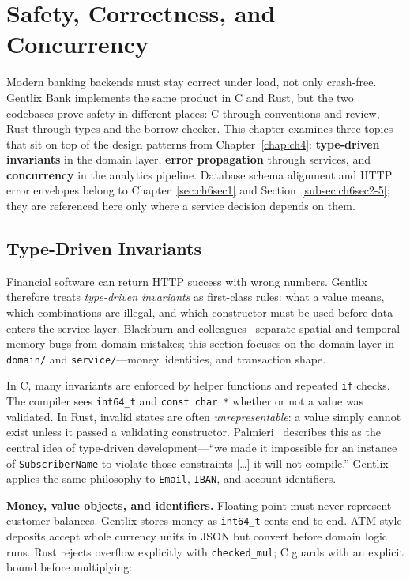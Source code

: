 \chapter{Safety, Correctness, and Concurrency}
\label{chap:ch5}

\par Modern banking backends must stay correct under load, not only crash-free. Gentlix Bank
implements the same product in C and Rust, but the two codebases prove safety in different
places: C through conventions and review, Rust through types and the borrow checker.
This chapter examines three topics that sit on top of the design patterns from
Chapter~\ref{chap:ch4}: \textbf{type-driven invariants} in the domain layer,
\textbf{error propagation} through services, and \textbf{concurrency} in the analytics
pipeline. Database schema alignment and HTTP error envelopes belong to
Chapter~\ref{sec:ch6sec1} and Section~\ref{subsec:ch6sec2-5}; they are referenced here
only where a service decision depends on them.

\section{Type-Driven Invariants}
\label{sec:ch5sec1}

Financial software can return HTTP success with wrong numbers. Gentlix therefore treats
\emph{type-driven invariants} as first-class rules: what a value means, which combinations
are illegal, and which constructor must be used before data enters the service layer.
Blackburn and colleagues~\cite{Blackburn2025} separate spatial and temporal memory bugs
from domain mistakes; this section focuses on the domain layer in \texttt{domain/} and
\texttt{service/}---money, identities, and transaction shape.

In C, many invariants are enforced by helper functions and repeated \texttt{if} checks.
The compiler sees \texttt{int64\_t} and \texttt{const char *} whether or not a value was
validated. In Rust, invalid states are often \emph{unrepresentable}: a value simply
cannot exist unless it passed a validating constructor. Palmieri~\cite{Palmieri2022}
describes this as the central idea of type-driven development---``we made it impossible
for an instance of \texttt{SubscriberName} to violate those constraints [\ldots] it will
not compile.'' Gentlix applies the same philosophy to \texttt{Email}, \texttt{IBAN}, and
account identifiers.

\medskip\noindent\textbf{Money, value objects, and identifiers.}\quad
Floating-point must never represent customer balances. Gentlix stores money as
\texttt{int64\_t} cents end-to-end. ATM-style deposits accept whole currency units in JSON
but convert before domain logic runs. Rust rejects overflow explicitly with
\texttt{checked\_mul}; C guards with an explicit bound before multiplying:

